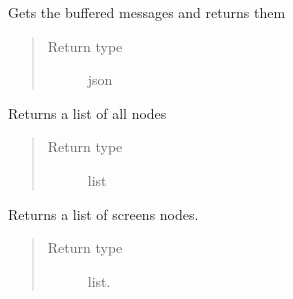 \documentclass[letterpaper,10pt,english]{sphinxmanual}
\begin{document}
\begin{fulllineitems}
\begin{fulllineitems}
\begin{quote}
\begin{description}
\end{description}\end{quote}

\end{fulllineitems}


\begin{fulllineitems}
\label{swnp:swnp.SWNP.get_buffer}
Gets the buffered messages and returns them
\begin{quote}\begin{description}
\item[{Return type}] \leavevmode
json

\end{description}\end{quote}

\end{fulllineitems}


\begin{fulllineitems}
\label{swnp:swnp.SWNP.get_list}
Returns a list of all nodes
\begin{quote}\begin{description}
\item[{Return type}] \leavevmode
list

\end{description}\end{quote}

\end{fulllineitems}


\begin{fulllineitems}
\label{swnp:swnp.SWNP.get_screen_list}
Returns a list of screens nodes.
\begin{quote}\begin{description}
\item[{Return type}] \leavevmode
list.

\end{description}\end{quote}

\end{fulllineitems}



\end{fulllineitems}
\end{document}
